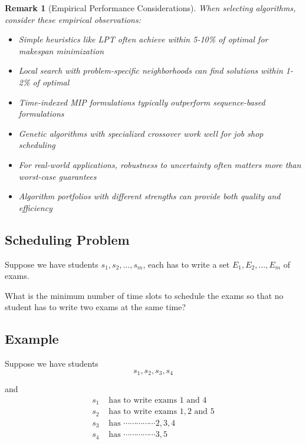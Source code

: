 \documentclass{article}
\newtheorem{remark}{Remark}
\theoremstyle{definition}
\begin{document}
\begin{remark}[Empirical Performance Considerations]
When selecting algorithms, consider these empirical observations:
\begin{itemize}
    \item Simple heuristics like LPT often achieve within 5-10\% of optimal for makespan minimization
    \item Local search with problem-specific neighborhoods can find solutions within 1-2\% of optimal
    \item Time-indexed MIP formulations typically outperform sequence-based formulations
    \item Genetic algorithms with specialized crossover work well for job shop scheduling
    \item For real-world applications, robustness to uncertainty often matters more than worst-case guarantees
    \item Algorithm portfolios with different strengths can provide both quality and efficiency
\end{itemize}
\end{remark}

\subsection*{Scheduling Problem}\label{subsec:scheduling-problem}

Suppose we have students $s_1, s_2, \ldots, s_m$, each has to write a set $E_1, E_2, \ldots, E_m$ of exams.

What is the minimum number of time slots to schedule the exams so that no student has to write two exams at the same time?

\subsection*{Example}

Suppose we have students
\[s_1, s_2, s_3, s_4\]

and
\begin{align*}
s_1 &\text{ has to write exams } 1 \text{ and } 4 \\
s_2 &\text{ has to write exams } 1, 2 \text{ and } 5 \\
s_3 &\text{ has } \cdots \cdots \cdots \cdots \cdots 2, 3, 4 \\
s_4 &\text{ has } \cdots \cdots \cdots \cdots \cdots 3, 5
\end{align*}
\end{document}
